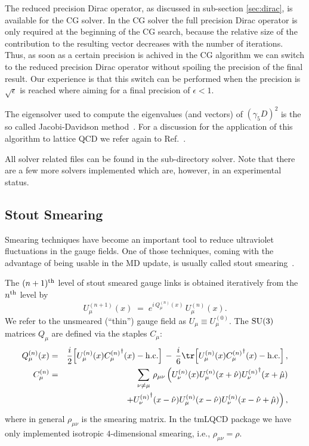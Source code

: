 The reduced precision Dirac operator, as discussed in sub-section
\ref{sec:dirac}, is available for the CG solver. In the CG solver the 
full precision Dirac operator is only required at the beginning of the
CG search, because the relative size of the contribution to the
resulting vector decreases with the number of iterations. Thus, as soon
as a certain precision is achived in the CG algorithm we can switch to
the reduced precision Dirac operator without spoiling the precision of
the final result. Our experience is that this switch can be performed
when the precision is $\sqrt{\epsilon}$ is reached where aiming for a
final precision of $\epsilon < 1$.

The eigensolver used to compute the eigenvalues (and vectors) of
$(\gamma_5 D)^2$ is the so called Jacobi-Davidson 
method~\cite{Sleijpen:1996aa,Geus:2002}. For a discussion for the
application of this algorithm to lattice QCD we refer again to
Ref.~\cite{Chiarappa:2004ry,Chiarappa:2006hz}. 

All solver related files can be found in the sub-directory {\ttfamily
  solver}. Note that there are a few more solvers implemented which
are, however, in an experimental status.

\subsection{Stout Smearing}

Smearing techniques have become an important tool to reduce
ultraviolet fluctuations in the gauge fields. One of those techniques,
coming with the advantage of being usable in the MD update, is usually
called stout smearing~\cite{Morningstar:2003gk}. 

The $(n+1)^{\rm th}$ level of stout smeared gauge links is obtained iteratively
from the $n^{\rm th}$ level by
\begin{equation*}
  U_\mu^{(n+1)}(x)\;=\;e^{i\,Q_\mu^{(n)}(x)}\,U_\mu^{(n)}(x).
\end{equation*}
We refer to the unsmeared (``thin'') gauge field as $U_\mu\equiv
U_\mu^{(0)}$.
The ${\rm SU}(3)$ matrices $Q_\mu$ are defined via the staples $C_\mu$:
\begin{eqnarray}
  Q_\mu^{(n)}(x) &=& \frac{i}2\Big[U^{(n)}_\mu(x){C_\mu^{(n)}}^\dagger(x)
  - {\mathrm{h.c.}}\Big]\,-\,\frac{i}{6}\tr\Big[U^{(n)}_\mu(x){C_\mu^{(n)}}^\dagger(x)
  - {\mathrm{h.c.}}\Big]\,,\nonumber\\
  C_\mu^{(n)} &=& \sum_{\nu\neq\mu}\,\rho_{\mu\nu}\,
  \Big(U_\nu^{(n)}(x)U_\mu^{(n)}(x+\hat\nu){U_\nu^{(n)}}^\dagger(x+\hat\mu)
  \nonumber\\
  && \;\;\;
  +{U_\nu^{(n)}}^\dagger(x-\hat\nu)U_\mu^{(n)}(x-\hat\nu)U_\nu^{(n)}(x-\hat\nu+\hat\mu)
  \Big)\,,\nonumber
\end{eqnarray}
where in general $\rho_{\mu\nu}$ is the smearing matrix.
In the tmLQCD package we have only implemented isotropic $4$-dimensional
smearing, i.e., $\rho_{\mu\nu}=\rho$.

